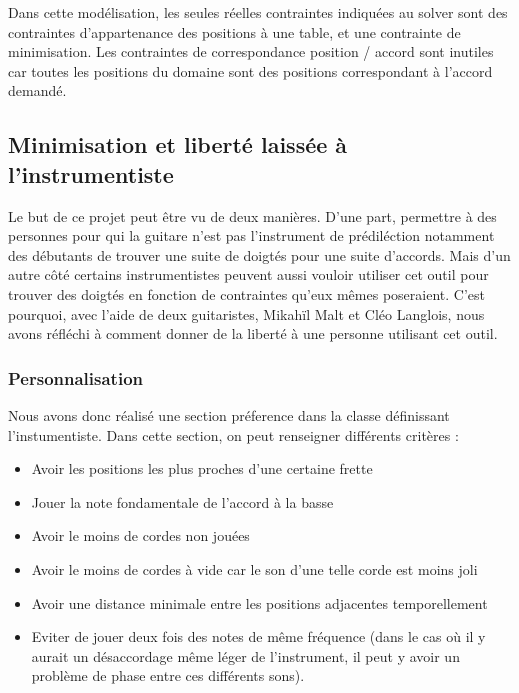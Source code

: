 Dans cette modélisation, les seules réelles contraintes indiquées au solver
sont des contraintes d'appartenance des positions à une table, 
et une contrainte de minimisation.
Les contraintes de correspondance position / accord sont inutiles car toutes
les positions du domaine sont des positions correspondant à l'accord demandé.



\subsection{Minimisation et liberté laissée à l'instrumentiste}
\label{subsec:Minimisation}

Le but de ce projet peut être vu de deux manières. D'une part, permettre à des
personnes pour qui la guitare n'est pas l'instrument de prédiléction notamment
des débutants de trouver une suite de doigtés pour une suite d'accords. 
Mais d'un autre côté certains instrumentistes peuvent aussi vouloir utiliser 
cet outil pour trouver des doigtés en fonction de contraintes qu'eux mêmes 
poseraient.
C'est pourquoi, avec l'aide de deux guitaristes, Mikahïl Malt et Cléo Langlois,
nous avons réfléchi à comment donner de la liberté à une personne utilisant
cet outil.

\subsubsection{Personnalisation}
\label{subsubsec:Personalisation}

Nous avons donc réalisé une section préference dans la classe définissant
l'instumentiste. Dans cette section, on peut renseigner différents critères :

\begin{itemize}
\label{list:preferences}
  \item Avoir les positions les plus proches d'une certaine frette
  \item Jouer la note fondamentale de l'accord à la basse
  \item Avoir le moins de cordes non jouées
  \item Avoir le moins de cordes à vide car le son d'une telle corde est 
    moins joli
  \item Avoir une distance minimale entre les positions adjacentes
    temporellement
  \item Eviter de jouer deux fois des notes de même fréquence (dans le cas où
    il y aurait un désaccordage même léger de l'instrument, il peut y avoir un
    problème de phase entre ces différents sons).
\end{itemize}

